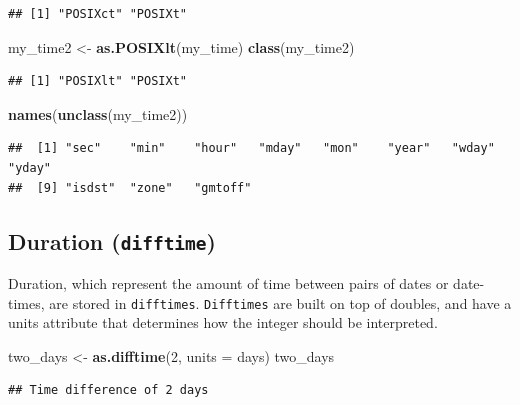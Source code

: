 \documentclass[
]{book}
\newenvironment{Shaded}{\begin{snugshade}}{\end{snugshade}}
\newcommand{\AttributeTok}[1]{\textcolor[rgb]{0.13,0.29,0.53}{#1}}
\newcommand{\DecValTok}[1]{\textcolor[rgb]{0.00,0.00,0.81}{#1}}
\newcommand{\FunctionTok}[1]{\textcolor[rgb]{0.13,0.29,0.53}{\textbf{#1}}}
\newcommand{\NormalTok}[1]{#1}
\newcommand{\OtherTok}[1]{\textcolor[rgb]{0.56,0.35,0.01}{#1}}
\newcommand{\StringTok}[1]{\textcolor[rgb]{0.31,0.60,0.02}{#1}}
\begin{document}
\begin{verbatim}
## [1] "POSIXct" "POSIXt"
\end{verbatim}

\begin{Shaded}
\begin{Highlighting}[]
\NormalTok{my\_time2 }\OtherTok{\textless{}{-}} \FunctionTok{as.POSIXlt}\NormalTok{(my\_time)}
\FunctionTok{class}\NormalTok{(my\_time2)}
\end{Highlighting}
\end{Shaded}

\begin{verbatim}
## [1] "POSIXlt" "POSIXt"
\end{verbatim}

\begin{Shaded}
\begin{Highlighting}[]
\FunctionTok{names}\NormalTok{(}\FunctionTok{unclass}\NormalTok{(my\_time2))}
\end{Highlighting}
\end{Shaded}

\begin{verbatim}
##  [1] "sec"    "min"    "hour"   "mday"   "mon"    "year"   "wday"   "yday"  
##  [9] "isdst"  "zone"   "gmtoff"
\end{verbatim}

\hypertarget{duration-difftime}{%
\subsection{\texorpdfstring{Duration (\texttt{difftime})}{Duration (difftime)}}\label{duration-difftime}}

Duration, which represent the amount of time between pairs of dates or date-times, are stored in \texttt{difftimes}. \texttt{Difftimes} are built on top of doubles, and have a units attribute that determines how the integer should be interpreted.

\begin{Shaded}
\begin{Highlighting}[]
\NormalTok{two\_days }\OtherTok{\textless{}{-}} \FunctionTok{as.difftime}\NormalTok{(}\DecValTok{2}\NormalTok{, }\AttributeTok{units =} \StringTok{\textquotesingle{}days\textquotesingle{}}\NormalTok{)}
\NormalTok{two\_days}
\end{Highlighting}
\end{Shaded}

\begin{verbatim}
## Time difference of 2 days
\end{verbatim}
\end{document}
